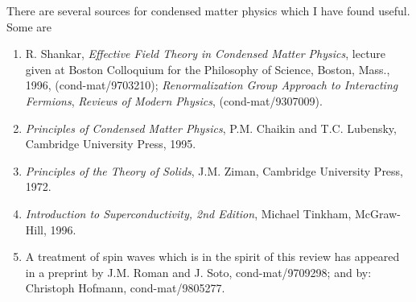 \documentclass[12pt]{report}
\begin{document}
There are several sources for condensed matter physics
which I have found useful. Some are

\begin{enumerate}

\item
R. Shankar, {\sl Effective Field Theory in Condensed Matter
Physics}, lecture given at Boston Colloquium for the
Philosophy of Science, Boston, Mass., 1996,
(cond-mat/9703210); {\sl Renormalization Group Approach to
Interacting Fermions}, {\it Reviews of Modern Physics},
(cond-mat/9307009).

\item
{\it Principles of Condensed Matter Physics}, P.M. Chaikin
and T.C. Lubensky, Cambridge University Press, 1995.

\item
{\it Principles of the Theory of Solids}, J.M. Ziman,
Cambridge University Press, 1972.

\item
{\it Introduction to Superconductivity, 2nd Edition},
Michael Tinkham, McGraw-Hill, 1996.

\item
A treatment of spin waves which is in the spirit of this
review has appeared in a preprint by J.M. Roman and J.
Soto, cond-mat/9709298; and by: Christoph Hofmann,
cond-mat/9805277.

\end{enumerate}
\end{document}

